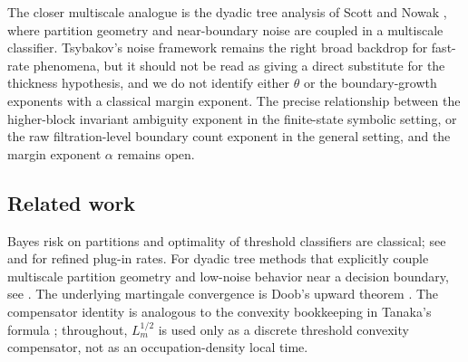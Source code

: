 \documentclass{etds}%
\numberwithin{equation}{section}
\theoremstyle{plain}
\theoremstyle{definition}
\theoremstyle{remark}
\begin{document}
The closer multiscale analogue is the dyadic tree analysis of
Scott and Nowak \cite{ScottNowak2006Dyadic}, where partition geometry and
near-boundary noise are coupled in a multiscale classifier.  Tsybakov's noise
framework remains the right broad backdrop for fast-rate phenomena, but it
should not be read as giving a direct substitute for the thickness hypothesis,
and we do not identify either $\theta$ or the boundary-growth exponents with a
classical margin exponent.
The precise relationship between the higher-block invariant ambiguity exponent
in the finite-state symbolic setting, or the raw filtration-level boundary
count exponent in the general setting, and the margin exponent $\alpha$
remains open.

\subsection{Related work}
\label{sub:related}

Bayes risk on partitions and optimality of threshold classifiers are classical;
see \cite{DevroyeGyorfiLugosi1996} and \cite{AudibertTsybakov2007} for refined
plug-in rates.  For dyadic tree methods that explicitly couple multiscale
partition geometry and low-noise behavior near a decision boundary, see
\cite{ScottNowak2006Dyadic}.  The underlying martingale convergence is Doob's
upward theorem \cite{Doob1953,Williams1991,Durrett2019}.  The compensator
identity is analogous to the convexity bookkeeping in Tanaka's formula
\cite{Tanaka1963,RevuzYor1999}; throughout,
$L_m^{1/2}$ is used only as a discrete threshold convexity compensator, not
as an occupation-density local time.
\end{document}

